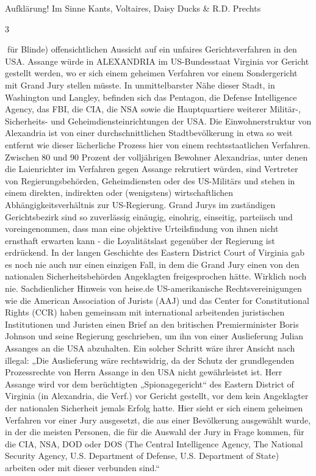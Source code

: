 \begin{multicols}{2}
Aufklärung!
Im Sinne Kants, Voltaires, Daisy Ducks \& R.D. Prechts

3

für Blinde) offensichtlichen Aussicht auf ein unfaires Gerichtsverfahren in den USA.
Assange würde in ALEXANDRIA im US-Bundesstaat Virginia vor Gericht gestellt werden, wo er sich einem geheimen Verfahren vor einem Sondergericht mit Grand
Jury stellen müsste. In unmittelbarster Nähe dieser
Stadt, in Washington und Langley, befinden sich das
Pentagon, die Defense Intelligence Agency, das FBI, die
CIA, die NSA sowie die Hauptquartiere weiterer Militär-,
Sicherheits- und Geheimdiensteinrichtungen der USA.
Die Einwohnerstruktur von Alexandria ist von einer
durchschnittlichen Stadtbevölkerung in etwa so weit
entfernt wie dieser lächerliche Prozess hier von einem
rechtsstaatlichen Verfahren. Zwischen 80 und 90 Prozent
der volljährigen Bewohner Alexandrias, unter denen die
Laienrichter im Verfahren gegen Assange rekrutiert würden, sind Vertreter von Regierungsbehörden, Geheimdiensten oder des US-Militärs und stehen in einem direkten, indirekten oder (wenigstens) wirtschaftlichen
Abhängigkeitsverhältnis zur US-Regierung. Grand Jurys
im zuständigen Gerichtsbezirk sind so zuverlässig einäugig, einohrig, einseitig, parteiisch und voreingenommen, dass man eine objektive Urteilsfindung von ihnen nicht ernsthaft erwarten kann - die Loyalitätslast
gegenüber der Regierung ist erdrückend. In der langen
Geschichte des Eastern District Court of Virginia gab es
noch nie auch nur einen einzigen Fall, in dem die Grand
Jury einen von den nationalen Sicherheitsbehörden Angeklagten freigesprochen hätte. Wirklich noch nie.
Sachdienlicher Hinweis von heise.de
US-amerikanische Rechtsvereinigungen wie die American Association of Jurists (AAJ) und das Center for Constitutional Rights (CCR) haben gemeinsam mit international arbeitenden juristischen Institutionen und Juristen
einen Brief an den britischen Premierminister Boris Johnson und seine Regierung geschrieben, um ihn von einer
Auslieferung Julian Assanges an die USA abzuhalten. Ein
solcher Schritt wäre ihrer Ansicht nach illegal:
„Die Auslieferung wäre rechtswidrig, da der Schutz der
grundlegenden Prozessrechte von Herrn Assange in den
USA nicht gewährleistet ist. Herr Assange wird vor dem
berüchtigten „Spionagegericht“ des Eastern District of
Virginia (in Alexandria, die Verf.) vor Gericht gestellt, vor
dem kein Angeklagter der nationalen Sicherheit jemals
Erfolg hatte. Hier sieht er sich einem geheimen Verfahren vor einer Jury ausgesetzt, die aus einer Bevölkerung
ausgewählt wurde, in der die meisten Personen, die für
die Auswahl der Jury in Frage kommen, für die CIA, NSA,
DOD oder DOS (The Central Intelligence Agency, The National Security Agency, U.S. Department of Defense, U.S.
Department of State) arbeiten oder mit dieser verbunden
sind.“


\end{multicols}
